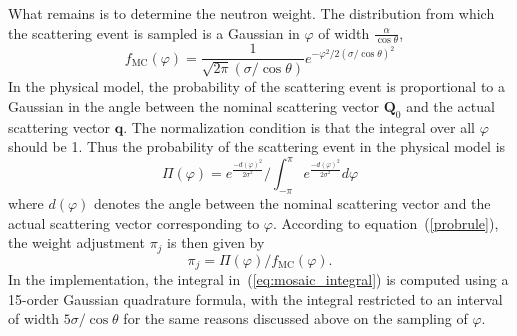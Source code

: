 What remains is to determine the neutron weight. The distribution from
which the scattering event is sampled is a Gaussian in $\varphi$ of
width $\frac{\alpha}{\cos\theta}$,
\begin{equation}
    f_\textrm{MC}(\varphi) = \frac{1}{\sqrt{2\pi}(\sigma/\cos\theta)}
            e^{-\varphi^2/2(\sigma/\cos\theta)^2}
\end{equation}
In the physical model, the probability of the scattering event is
proportional to a Gaussian in the angle between the nominal scattering
vector $\textbf{Q}_0$ and the actual scattering vector $\textbf{q}$. The
normalization condition is that the integral over all $\varphi$ should
be 1. Thus the probability of the scattering event in the physical model
is
\begin{equation}
  \label{eq:mosaic_integral}
  \Pi(\varphi) = e^{\frac{-d(\varphi)^2}{2\sigma^2}} /
   \int_{-\pi}^{\pi} e^{\frac{-d(\varphi)^2}{2\sigma^2}} d\varphi
\end{equation}
where $d(\varphi)$ denotes the angle between the nominal scattering
vector and the actual scattering vector corresponding to $\varphi$.
According to equation~(\ref{probrule}), the weight adjustment $\pi_j$ is
then given by
\begin{equation}
\pi_j = \Pi(\varphi) / f_\textrm{MC}(\varphi).
\end{equation}
In the implementation, the integral in~(\ref{eq:mosaic_integral}) is computed
using a 15-order Gaussian quadrature formula, with the integral
restricted to an interval of width $5\sigma/\cos\theta$ for the same
reasons discussed above on the sampling of $\varphi$.
